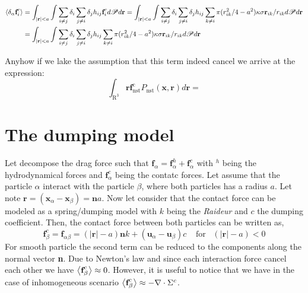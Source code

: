 \begin{align}    
\left<\delta_\alpha \textbf{f}_i^c\right>
&= \int_{|\textbf{r}|<a}
\int \sum_{i \neq j} \delta_i \sum_{j\neq i} \delta_j h_{ij}
\textbf{f}_i^c d\mathscr{P} d\textbf{r}
= \int_{|\textbf{r}|<a}
\int \sum_{i \neq j} \delta_i \sum_{j\neq i} \delta_j h_{ij}
\sum_{k\neq i} \pi (r_{ik}^2/4 - a^2) \kappa \sigma \textbf{r}_{ik}/r_{ik} d\mathscr{P} d\textbf{r}\\
&= \int_{|\textbf{r}|<a}
\int \sum_{i \neq j} \delta_i \sum_{j\neq i} \delta_j h_{ij}
\sum_{k\neq i} \pi (r_{ik}^2/4 - a^2) \kappa \sigma \textbf{r}_{ik}/r_{ik} d\mathscr{P} d\textbf{r}
\\
\end{align}

Anyhow if we lake the assumption that this term indeed cancel we arrive at the expression: 
\begin{equation*}
    \int_{\mathrm{R}^3} \textbf{r} \textbf{f}_\text{nst}^\text{c} P_\text{nst}(\textbf{x},\textbf{r}) d\textbf{r}
    = 
\end{equation*}

\section{The dumping model}

Let decompose the drag force such that $\textbf{f}_\alpha = \textbf{f}_\alpha^h + \textbf{f}_\alpha^c$ with $^h$ being the hydrodynamical forces and $\textbf{f}^c_\alpha$ being the contatc forces. 
Let assume that the particle $\alpha$ interact with the particle $\beta$, where both particles has a radius $a$.
Let note $\textbf{r} = (\textbf{x}_\alpha - \textbf{x}_\beta) = \textbf{n} a$. 
Now let consider that the contact force can be modeled as a spring/dumping model with $k$ being the \textit{Raideur} and $c$ the dumping coefficient.
Then, the contact force between both particles can be written as, 
\begin{equation}
    \textbf{f}_\beta^c
    = \textbf{f}_{\alpha\beta}
    = (|\textbf{r}| - a) \textbf{n} k 
    + (\textbf{u}_\alpha - \textbf{u}_\beta) c
    \;\;\;\;\text{for} \;\;\; (|\textbf{r}| - a) < 0
\end{equation}
For smooth particle the second term can be reduced to the components along the normal vector \textbf{n}.  
Due to Newton's  law and since each interaction force cancel each other we have $\left<\textbf{f}_\beta^c\right> \approx 0$. 
However, it is useful to notice that we have in the case of inhomogeneous scenario $\left<\textbf{f}_\beta^c\right> \approx - \mathbf{\nabla}\cdot \Sigma^c$.

